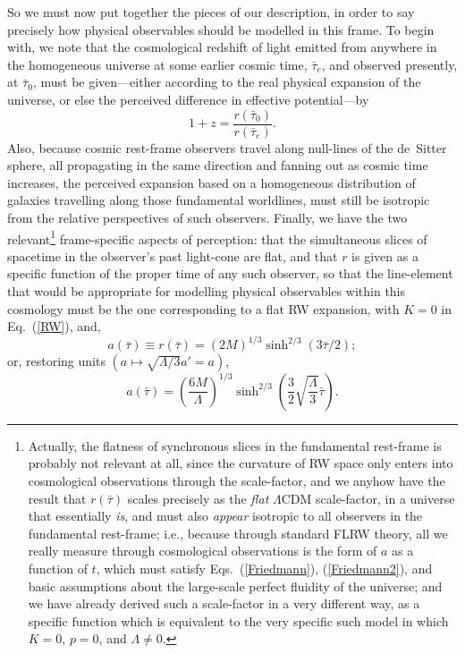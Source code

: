 So we must now put together the pieces of our description, in order to say precisely how physical observables should be modelled in this frame. To begin with, we note that the cosmological redshift of light emitted from anywhere in the homogeneous universe at some earlier cosmic time, $\bar\tau_{e}$, and observed presently, at $\bar\tau_0$, must be given---either according to the real physical expansion of the universe, or else the perceived difference in effective potential---by 
\begin{equation}
1+z=\frac{r(\bar\tau_0)}{r(\bar\tau_e)}.\label{z_SdS}
\end{equation}
Also, because cosmic rest-frame observers travel along null-lines of the de~Sitter sphere, all propagating in the same direction and fanning out as cosmic time increases, the perceived expansion based on a homogeneous distribution of galaxies travelling along those fundamental worldlines, must still be isotropic from the relative perspectives of such observers. Finally, we have the two relevant\footnote{Actually, the flatness of synchronous slices in the fundamental rest-frame is probably not relevant at all, since the curvature of RW space only enters into cosmological observations through the scale-factor, and we anyhow have the result that $r(\bar\tau)$ scales precisely as the \textit{flat} $\Lambda$CDM scale-factor, in a universe that essentially \textit{is}, and must also \textit{appear} isotropic to all observers in the fundamental rest-frame; i.e., because through standard FLRW theory, all we really measure through cosmological observations is the form of $a$ as a function of $t$, which must satisfy Eqs.~(\ref{Friedmann}), (\ref{Friedmann2}), and basic assumptions about the large-scale perfect fluidity of the universe; and we have already derived such a scale-factor in a very different way, as a specific function which is equivalent to the very specific such model in which $K=0$, $p=0$, and $\Lambda\neq0$.} frame-specific aspects of perception: that the simultaneous slices of spacetime in the observer's past light-cone are flat, and that $r$ is given as a specific function of the proper time of any such observer, so that the line-element that would be appropriate for modelling physical observables within this cosmology must be the one corresponding to a flat RW expansion, with $K=0$ in Eq.~(\ref{RW}), and,
\begin{equation}
a(\bar\tau)\equiv{r}(\bar\tau)=(2M)^{1/3}\sinh^{2/3}\left(3\bar\tau/2\right);\label{a_SdS_pure}
\end{equation}
or, restoring units $(a\mapsto\sqrt{\Lambda/3}a'=a)$,
\begin{equation}
a(\bar\tau)=\left(\frac{6M}{\Lambda}\right)^{1/3}\sinh^{2/3}\left(\frac{3}{2}\sqrt{\frac{\Lambda}{3}}\bar\tau\right).\label{a_SdS}
\end{equation}

